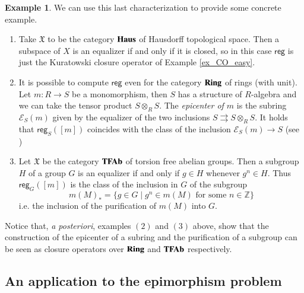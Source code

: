 \documentclass[12pt]{article}
\theoremstyle{definition}
\newtheorem{example}[lemma]{Example}
\newcommand*{\ec}[2]{\mathscr{E}_{#1}(#2)}
\def\X{\mathfrak X}
\newcommand{\Ring}{\textbf{\textup{Ring}}}
\newcommand{\TFA}{\textbf{\textup{TFAb}}}
\newcommand{\Haus}{\textbf{\textup{Haus}}}
\numberwithin{equation}{section}
\def\reg{\mathsf{reg}}
\begin{document}
\begin{example}
	We can use this last characterization to provide some concrete example.
	
	\begin{enumerate}[\rm (1)] 
		\item Take $\X$ to be the category $\Haus$ of Hausdorff topological space. Then a subspace of $X$ is an equalizer if and only if it is closed, so in this case $\reg$ is just the Kuratowski closure operator of Example \ref{ex_CO_easy}.
		
		\item It is possible to compute $\reg$ even for the category $\Ring$ of rings (with unit). Let $m:R\rightarrow S$ be a monomorphism, then $S$ has a structure of $R$-algebra and we can take the tensor product $S\otimes_R S$. The \emph{epicenter of $m$} is the subring $\ec{S}{m}$ given by the equalizer of the two inclusions $S\rightrightarrows S\otimes_R S$. It holds that $\reg_{S}([m])$ coincides with the class of the inclusion $\ec{S}{m}\rightarrow S$ (see \cite{epiring1,epiring2})
		
		\item Let $\X$ be the category $\TFA$ of torsion free abelian groups. Then a subgroup $H$ of a group $G$ is an equalizer if and only if  $g\in H$ whenever $g^{n}\in H$. Thus $\reg_{G}([m])$ is the class of the inclusion in $G$ of the subgroup
		\[
	m(M)_*=\{g\in G \mid g^{n}\in m(M) \text{ for some } n \in \mathbb{Z}\}	
		\]
		i.e. the inclusion of the purification of $m(M)$ into $G$.
	\end{enumerate}
 \end{example}

Notice that, \emph{a posteriori}, examples $(2)$ and $(3)$ above, show that the construction of the epicenter of a subring and the purification of a subgroup can be seen as closure operators over $\Ring$ and $\TFA$ respectively.

\normalmarginpar 

\subsection{An application to the epimorphism problem } 
\end{document}
